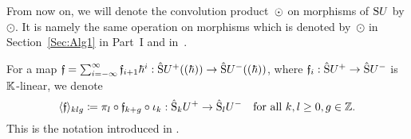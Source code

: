 \documentclass[\MainFolder/Text.tex]{subfiles}
\begin{document}
\begin{Notation}[Replacing $\Star$ with $\odot$ for $V=\Sym U$]
From now on, we will denote the convolution product~$\Star$ on morphisms of $\mathrm{S} U$ by $\odot$. It is namely the same operation on morphisms which is denoted by~$\odot$ in Section~\ref{Sec:Alg1} in Part~I and in~\cite{Cieliebak2015}.
\end{Notation}
\renewcommand{\Star}{\odot}
For a map $\mathfrak{f} = \sum_{i=-\infty}^\infty \mathfrak{f}_{i+1}\hbar^i: \hat{\mathrm{S}}U^+((\hbar)) \rightarrow \hat{\mathrm{S}}U^-((\hbar))$, where $\mathfrak{f}_{i}: \hat{\mathrm{S}}U^+\rightarrow\hat{\mathrm{S}}U^-$ is $\mathbb{K}$-linear, we denote 
$$ \langle \mathfrak{f}\rangle_{klg} \coloneqq \pi_l \circ \mathfrak{f}_{k+g}\circ \iota_k: \hat{\mathrm{S}}_k U^+ \rightarrow \hat{\mathrm{S}}_l U^-\quad\text{for all }k, l\ge 0, g\in \mathbb{Z}. $$
This is the notation introduced in \cite[Equation~(2.14)]{Cieliebak2015}.
\end{document}
